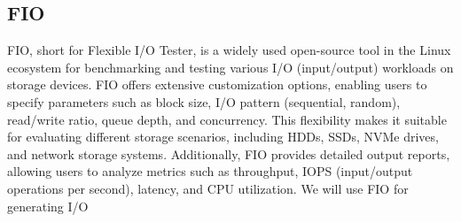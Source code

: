 \vspace{1em}
\subsection{FIO}
FIO, short for Flexible I/O Tester, is a widely used open-source tool in the Linux ecosystem for benchmarking and testing various I/O (input/output) workloads on storage devices. FIO offers extensive customization options, enabling users to specify parameters such as block size, I/O pattern (sequential, random), read/write ratio, queue depth, and concurrency. This flexibility makes it suitable for evaluating different storage scenarios, including HDDs, SSDs, NVMe drives, and network storage systems. Additionally, FIO provides detailed output reports, allowing users to analyze metrics such as throughput, IOPS (input/output operations per second), latency, and CPU utilization. We will use FIO for generating I/O 
\vspace{1em}
